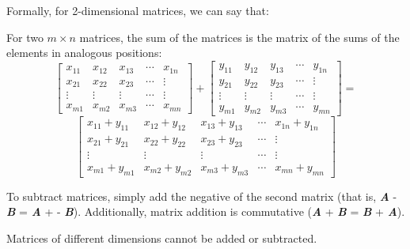 Formally, for 2-dimensional matrices, we can say that:
\begin{mdframed}[style = important, frametitle={Adding and Subtracting Matrics}]
For two $m \times n$ matrices, the sum of the matrices is the matrix of the
sums of the elements in analogous positions:
$$\begin{bmatrix}
x_{11} & x_{12} & x_{13} & \cdots & x_{1n}\\
x_{21} & x_{22} & x_{23} & \cdots & \vdots\\
\vdots & \vdots & \vdots & \cdots & \vdots\\
x_{m1} & x_{m2} & x_{m3} & \cdots & x_{mn}
\end{bmatrix}
+ \begin{bmatrix}
y_{11} & y_{12} & y_{13} & \cdots & y_{1n}\\
y_{21} & y_{22} & y_{23} & \cdots & \vdots\\
\vdots & \vdots & \vdots & \cdots & \vdots\\
y_{m1} & y_{m2} & y_{m3} & \cdots & y_{mn}
\end{bmatrix} = $$
$$\begin{bmatrix}
x_{11} + y_{11} & x_{12} + y_{12} & x_{13} + y_{13} & \cdots & x_{1n} + y_{1n}\\
x_{21} + y_{21} & x_{22} + y_{22} & x_{23} + y_{23} & \cdots & \vdots\\
\vdots & \vdots & \vdots & \cdots & \vdots\\
x_{m1} + y_{m1} & x_{m2} + y_{m2} & x_{m3} + y_{m3} & \cdots & x_{mn} + y_{mn}
\end{bmatrix}$$

To subtract matrices, simply add the negative of the second matrix (that is,
\textbf{\textit{A}} - \textbf{\textit{B}} = \textbf{\textit{A}} + -\textbf{
\textit{B}}). Additionally, matrix addition is commutative (\textbf{\textit{A}}
+ \textbf{\textit{B}} = \textbf{\textit{B}} + \textbf{\textit{A}}).

Matrices of different dimensions cannot be added or subtracted. 
\end{mdframed}

